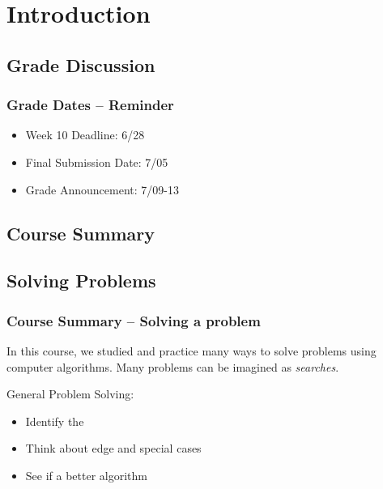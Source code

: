 \section{Introduction}


\subsection{Grade Discussion}

\begin{frame}
  \frametitle{Grade Dates -- Reminder}

  \begin{itemize}
  \item Week 10 Deadline: 6/28
    \bigskip

  \item Final Submission Date: 7/05
    \bigskip

  \item Grade Announcement: 7/09-13
  \end{itemize}
\end{frame}

\subsection{Course Summary}

\subsection{Solving Problems}
\begin{frame}
  \frametitle{Course Summary -- Solving a problem}

  \begin{block}{}
    In this course, we studied and practice many ways
    to solve problems using computer algorithms. Many
    problems can be imagined as \emph{searches}.
  \end{block}

  \vfill

  General Problem Solving:
  \begin{itemize}
  \item Identify the 
  \item Think about edge and special cases
  \item See if a better algorithm 
  \end{itemize}

\end{frame}

